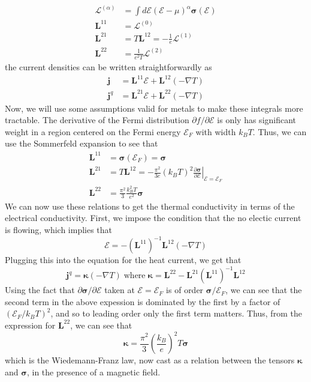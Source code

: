 \documentclass{thesis-umich}
\begin{document}
\begin{align*} \mathcal{L}^{(\alpha)} &= \int d\mathcal{E} (\mathcal{E} - \mu)^\alpha
\mathbf{\sigma}(\mathcal{E}) \\
	\mathbf{L}^{11} &= \mathcal{L}^{(0)} \\
	\mathbf{L}^{21} &= T \mathbf{L}^{12} = -\frac{1}{e}\mathcal{L}^{(1)} \\
	\mathbf{L}^{22} &= \frac{1}{e^2T} \mathcal{L}^{(2)}
\end{align*}
the current densities can be written straightforwardly as
\begin{align*}
	\mathbf{j} &= \mathbf{L}^{11}\mathbf{\mathcal{E}} +
	\mathbf{L}^{12}(-\nabla T) \\
	\mathbf{j}^q &= \mathbf{L}^{21}\mathbf{\mathcal{E}} +
	\mathbf{L}^{22}(-\nabla T)
\end{align*}
Now, we will use some assumptions valid for metals to make these integrals more
tractable. The derivative of the Fermi distribution $\partial f / \partial
\mathcal{E}$ is only has significant weight in a region centered on the Fermi energy
$\mathcal{E}_F$ with width $k_BT$. Thus, we can use the Sommerfeld expansion to
see that
\begin{align*}
	\mathbf{L}^{11} &= \mathbf{\sigma}(\mathcal{E}_F) = \mathbf{\sigma} \\
	\mathbf{L}^{21} &= T\mathbf{L}^{12} = -\frac{\pi^2}{3e}(k_BT)^2
	\left.\frac{\partial \mathbf{\sigma}}{\partial
		\mathcal{E}}\right|_{\mathcal{E} = \mathcal{E}_F} \\
	\mathbf{L}^{22} &= \frac{\pi^2}{3} \frac{k_B^2T}{e^2}\mathbf{\sigma}
\end{align*}
We can now use these relations to get the thermal conductivity in terms of the
electrical conductivity. First, we impose the condition that the no electic
current is flowing, which implies that \[ \mathbf{\mathcal{E}} = -
(\mathbf{L}^{11})^{-1} \mathbf{L}^{12}(-\nabla T)\]
Plugging this into the equation for the heat current, we get that
\[ \mathbf{j}^q = \mathbf{\kappa}(-\nabla T) \;\mathrm{ where }\; \mathbf{\kappa} = \mathbf{L}^{22} - \mathbf{L}^{21}(\mathbf{L}^{11})^{-1}\mathbf{L}^{12} \]
Using the fact that $\partial \mathbf{\sigma}/\partial \mathcal{E}$ taken at $\mathcal{E} = \mathcal{E}_F$ is of order $\mathbf{\sigma}/\mathcal{E}_F$, we can see that the second term in the above expession is dominated by the first by a factor of $(\mathcal{E}_F/k_B T)^2$, and so to leading order only the first term matters. Thus, from the expression for $\mathbf{L}^{22}$, we can see that 
\[ \mathbf{\kappa} = \frac{\pi^2}{3} \left(\frac{k_B}{e}\right)^2 T \mathbf{\sigma} \]
which is the Wiedemann-Franz law, now cast as a relation between the tensors $\mathbf{\kappa}$ and $\mathbf{\sigma}$, in the presence of a magnetic field. 
\end{document}
